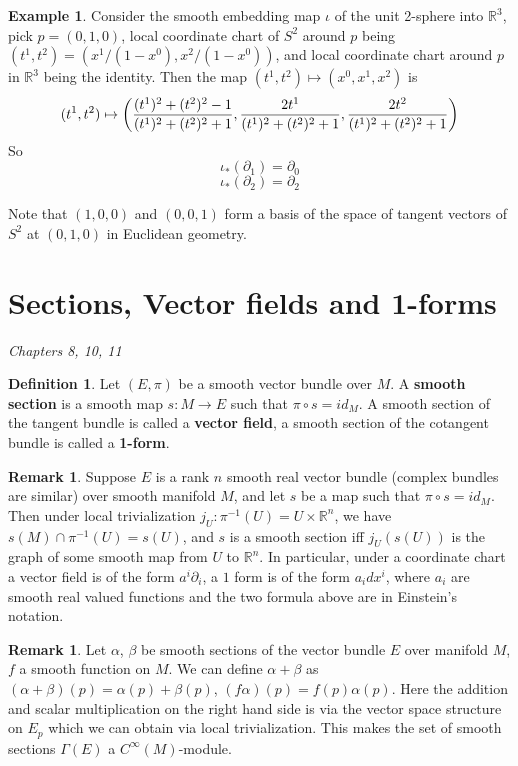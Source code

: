 \documentclass{article}
\theoremstyle{definition}
\newtheorem{dfn}[thm]{Definition}
\newtheorem{rmk}[thm]{Remark}
\newtheorem{exm}[thm]{Example}
\begin{document}
\begin{exm}
    Consider the smooth embedding map $\iota$ of the unit 2-sphere into $\mathbb{R}^3$, pick $p=(0, 1, 0)$, local coordinate chart of $S^2$ around $p$ being $(t^1, t^2)=(x^1/(1-x^0), x^2/(1-x^0))$, and local coordinate chart around $p$ in $\mathbb{R}^3$ being the identity. Then the map $(t^1, t^2)\mapsto (x^0, x^1, x^2)$ is
\[(t^1, t^2)\mapsto \left({(t^1)^2+(t^2)^2-1\over (t^1)^2+(t^2)^2+1}, {2t^1\over (t^1)^2+(t^2)^2+1}, {2t^2\over (t^1)^2+(t^2)^2+1}\right)\]
So 
\[\iota_*(\partial_1)=\partial_0\]
\[\iota_*(\partial_2)=\partial_2\]

Note that $(1, 0, 0)$ and $(0, 0, 1)$ form a basis of the space of tangent vectors of $S^2$ at $(0, 1, 0)$ in Euclidean geometry. 
\end{exm}
\newpage

\section{Sections, Vector fields and 1-forms}

{\em Chapters 8, 10, 11}\\

\begin{dfn}
    Let $(E, \pi)$ be a smooth vector bundle over $M$. A {\bf smooth section} is a smooth map $s: M\rightarrow E$ such that $\pi\circ s=id_M$. A smooth section of the tangent bundle is called a {\bf vector field}, a smooth section of the cotangent bundle is called a {\bf 1-form}.
\end{dfn}



\begin{rmk}\label{coordsec}
   Suppose $E$ is a rank $n$ smooth real vector bundle (complex bundles are similar) over smooth manifold $M$, and let $s$ be a map such that $\pi\circ s=id_M$. Then under local trivialization $j_U: \pi^{-1}(U)=U\times \mathbb{R}^n$, we have $s(M)\cap \pi^{-1}(U)=s(U)$, and $s$ is a smooth section iff $j_U(s(U))$ is the graph of some smooth map from $U$ to $\mathbb{R}^n$. In particular, under a coordinate chart a vector field is of the form $a^i\partial_i$, a $1$ form is of the form $a_idx^i$, where $a_i$ are smooth real valued functions and the two formula above are in Einstein's notation.
\end{rmk}


\begin{rmk}
    Let $\alpha$, $\beta$ be smooth sections of the vector bundle $E$ over manifold $M$, $f$ a smooth function on $M$. We can define $\alpha+\beta$ as $(\alpha+\beta)(p)=\alpha(p)+\beta(p)$, $(f\alpha)(p)=f(p)\alpha(p)$. Here the addition and scalar multiplication on the right hand side is via the vector space structure on $E_p$ which we can obtain via local trivialization. This makes the set of smooth sections $\Gamma(E)$ a $C^\infty(M)$-module.
\end{rmk}
\end{document}
